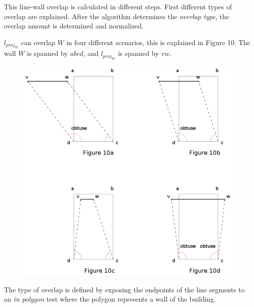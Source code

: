 \documentclass[10pt]{article}
\begin{document}
	This line-wall overlap is calculated in different steps.
	First different types of overlap are explained. After the algorithm
	determines the \emph{overlap type}, the overlap amount is determined and
	normalized.

	$l_{proj_W}$ can overlap $W$ in four different scenarios, this is explained
	in Figure 10. The wall $W$ is spanned by $abcd$, and $l_{proj_W}$ is spanned
	by $vw$.
	

	\begin{figure}[!ht]
	\centering
	\includegraphics[width=12cm]{img/overlaytypes.png}
	\end{figure}
		


	The type of overlap is defined by exposing the endpoints of the line
	segments to an \emph{in polygon} test where the polygon represents a 
	wall of the building.
\end{document}
